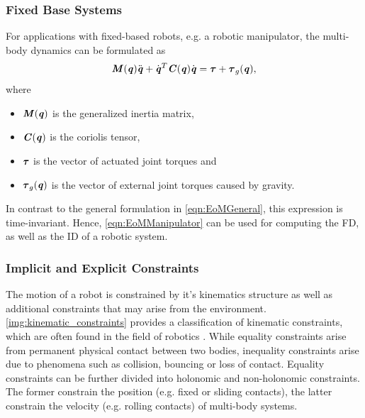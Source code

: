 \subsubsection{Fixed Base Systems}
For applications with fixed-based robots, e.g. a robotic manipulator, the multi-body dynamics can be formulated as
\begin{equation} \label{eqn:EoMManipulator}
\bm{\mathit{M}}(\bm{\mathit{q}})\ddot{\bm{\mathit{q}}}+\dot{\bm{\mathit{q}}}^T\bm{\mathit{C}}(\bm{\mathit{q}})\dot{\bm{\mathit{q}}}=\bm{\mathit{\tau}}+\bm{\mathit{\tau}}_g(\bm{\mathit{q}}),
\end{equation}
where 
\begin{itemize}
\item $\bm{\mathit{M}}(\bm{\mathit{q}})$ is the generalized inertia matrix, 
\item $\bm{\mathit{C}}(\bm{\mathit{q}})$ is the coriolis tensor, 
\item $\bm{\mathit{\tau}}$ is the vector of actuated joint torques and 
\item $\bm{\mathit{\tau}}_g(\bm{\mathit{q}})$ is the vector of external joint torques caused by gravity.
\end{itemize}
In contrast to the general formulation in \cref{eqn:EoMGeneral}, this expression is time-invariant. Hence, \cref{eqn:EoMManipulator} can be used for computing the \gls{FD}, as well as the \gls{ID} of a robotic system.

\subsubsection{Implicit and Explicit Constraints}
The motion of a robot is constrained by it's kinematics structure as well as additional constraints that may arise from the environment. \cref{img:kinematic_constraints} provides a classification of kinematic constraints, which are often found in the field of robotics \cite[Ch.3]{kumar2019modular}. While equality constraints arise from permanent physical contact between two bodies, inequality constraints arise due to phenomena such as collision, bouncing or loss of contact. Equality constraints can be further divided into holonomic and non-holonomic constraints. The former constrain the position (e.g. fixed or sliding contacts), the latter constrain the velocity (e.g. rolling contacts) of multi-body systems. 

